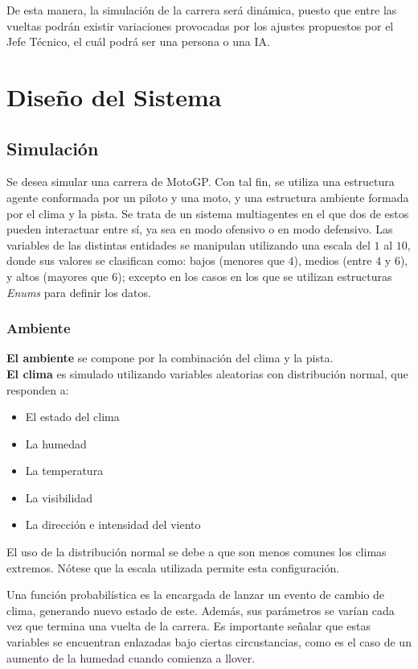 \documentclass[12pt, letterpaper,spanish]{article}
\theoremstyle{definition}
\theoremstyle{remark}
\begin{document}
	De esta manera, la simulación de la carrera será dinámica, puesto que entre las vueltas podrán existir variaciones provocadas por los ajustes propuestos por el Jefe Técnico, el cuál podrá ser una persona o una IA.\par

\newpage
\section{Diseño del Sistema}
		
	\subsection{Simulación {\footnotesize \cite{conferenciasS}\cite{garcia}}}
	Se desea simular una carrera de MotoGP. Con tal fin, se utiliza una estructura agente conformada por un piloto y una moto, y una estructura ambiente formada por el clima y la pista. Se trata de un sistema multiagentes en el que dos de estos pueden interactuar entre sí, ya sea en modo ofensivo o en modo defensivo. Las variables de las distintas entidades se manipulan utilizando una escala del $1$ al $10$, donde sus valores se clasifican como: bajos (menores que $4$), medios (entre $4$ y $6$), y altos (mayores que $6$); excepto en los casos en los que se utilizan estructuras \emph{Enums} para definir los datos.
	
		\subsubsection{Ambiente}
		\textbf{El ambiente} se compone por la combinación del clima y la pista.\\

		\textbf{El clima} es simulado utilizando variables aleatorias con distribución normal, que responden a:
		\begin{itemize}
    		\item El estado del clima
    		\item La humedad
    		\item La temperatura
		\item La visibilidad
		\item La dirección e intensidad del viento
		\end{itemize}

		El uso de la distribución normal se debe a que son menos comunes los climas extremos. Nótese que la escala utilizada permite esta configuración.

		Una función probabilística es la encargada de lanzar un evento de cambio de clima, generando nuevo estado de este. Además, sus parámetros se varían cada vez que termina una vuelta de la carrera. Es importante señalar que estas variables se encuentran enlazadas bajo ciertas circustancias, como es el caso de un aumento de la humedad cuando comienza a llover. \\ \\
\end{document}
